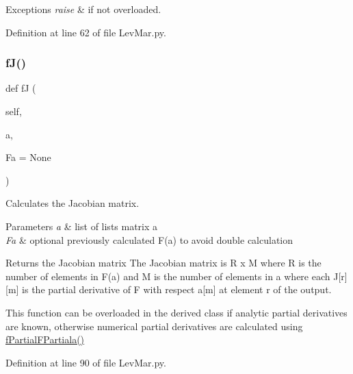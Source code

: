 \begin{DoxyExceptions}{Exceptions}
{\em raise} & if not overloaded. \\
\hline
\end{DoxyExceptions}


Definition at line 62 of file Lev\+Mar.\+py.

\mbox{\label{classSignalIntegrity_1_1Fit_1_1LevMar_1_1LevMar_a5852efb9aab8530b863efac8008cd425}} 
\subsubsection{\texorpdfstring{f\+J()}{fJ()}}
{\footnotesize\ttfamily def fJ (\begin{DoxyParamCaption}\item[{}]{self,  }\item[{}]{a,  }\item[{}]{Fa = {\ttfamily None} }\end{DoxyParamCaption})}



Calculates the Jacobian matrix. 


\begin{DoxyParams}{Parameters}
{\em a} & list of lists matrix a \\
\hline
{\em Fa} & optional previously calculated F(a) to avoid double calculation \\
\hline
\end{DoxyParams}
\begin{DoxyReturn}{Returns}
the Jacobian matrix The Jacobian matrix is R x M where R is the number of elements in F(a) and M is the number of elements in a where each J\mbox{[}r\mbox{]}\mbox{[}m\mbox{]} is the partial derivative of F with respect a\mbox{[}m\mbox{]} at element r of the output.
\end{DoxyReturn}
This function can be overloaded in the derived class if analytic partial derivatives are known, otherwise numerical partial derivatives are calculated using \hyperlink{classSignalIntegrity_1_1Fit_1_1LevMar_1_1LevMar_a2cb2f2f3d90e9eff6180a5b6a5ffa5cc}{f\+Partial\+F\+Partiala()} 

Definition at line 90 of file Lev\+Mar.\+py.

